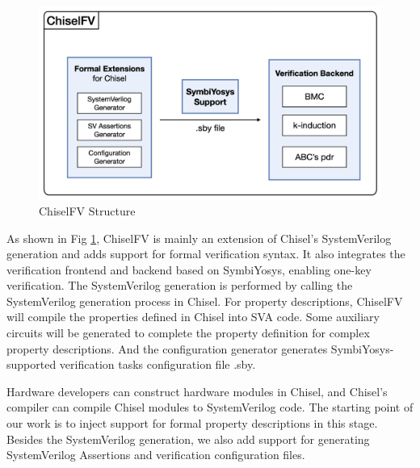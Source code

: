 \documentclass[conference]{IEEEtran}
\theoremstyle{definition}
\begin{document}
\begin{figure}[!htbp]
    \begin{center}
    \includegraphics[width=1\linewidth]{pics/structure.png}
    \caption{ChiselFV Structure}
    \label{fig: structure}
    \end{center}
\end{figure}

As shown in Fig \ref{fig: structure}, ChiselFV is mainly an extension of Chisel's SystemVerilog generation and adds support for formal verification syntax. It also integrates the verification frontend and backend based on SymbiYosys, enabling one-key verification. The SystemVerilog generation is performed by calling the SystemVerilog generation process in Chisel. 
For property descriptions, ChiselFV will compile the properties defined in Chisel into SVA code. Some auxiliary circuits will be generated to complete the property definition for complex property descriptions.
And the configuration generator generates SymbiYosys-supported verification tasks configuration file .sby. 

Hardware developers can construct hardware modules in Chisel, and Chisel's compiler can compile Chisel modules to SystemVerilog code. The starting point of our work is to inject support for formal property descriptions in this stage.
Besides the SystemVerilog generation, we also add support for generating SystemVerilog Assertions and verification configuration files.
\end{document}
